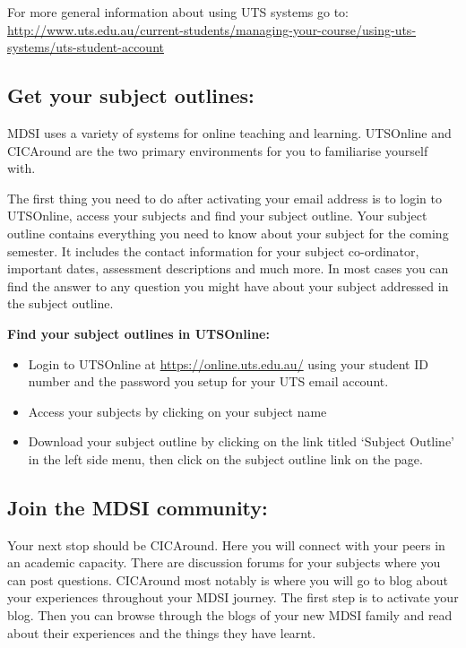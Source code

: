 \documentclass[]{book}
\providecommand{\tightlist}{%
  \setlength{\itemsep}{0pt}\setlength{\parskip}{0pt}}
\theoremstyle{definition}
\theoremstyle{definition}
\theoremstyle{remark}
\begin{document}
For more general information about using UTS systems go to:
\url{http://www.uts.edu.au/current-students/managing-your-course/using-uts-systems/uts-student-account}

\subsection{Get your subject outlines:}\label{get-your-subject-outlines}

MDSI uses a variety of systems for online teaching and learning.
UTSOnline and CICAround are the two primary environments for you to
familiarise yourself with.

The first thing you need to do after activating your email address is to
login to UTSOnline, access your subjects and find your subject outline.
Your subject outline contains everything you need to know about your
subject for the coming semester. It includes the contact information for
your subject co-ordinator, important dates, assessment descriptions and
much more. In most cases you can find the answer to any question you
might have about your subject addressed in the subject outline.

\textbf{Find your subject outlines in UTSOnline:}

\begin{itemize}
\tightlist
\item
  Login to UTSOnline at \url{https://online.uts.edu.au/} using your
  student ID number and the password you setup for your UTS email
  account.
\item
  Access your subjects by clicking on your subject name
\item
  Download your subject outline by clicking on the link titled `Subject
  Outline' in the left side menu, then click on the subject outline link
  on the page.
\end{itemize}

\subsection{Join the MDSI community:}\label{join-the-mdsi-community}

Your next stop should be CICAround. Here you will connect with your
peers in an academic capacity. There are discussion forums for your
subjects where you can post questions. CICAround most notably is where
you will go to blog about your experiences throughout your MDSI journey.
The first step is to activate your blog. Then you can browse through the
blogs of your new MDSI family and read about their experiences and the
things they have learnt.
\end{document}
